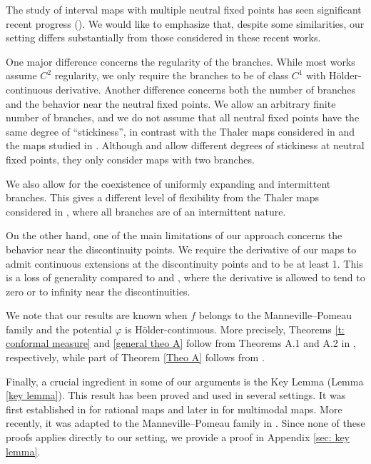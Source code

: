 \documentclass[10pt,a4paper]{amsart}
\numberwithin{equation}{section} %
\numberwithin{figure}{section} %
\renewcommand{\=}{\coloneqq}
\begin{document}
The study of interval maps with multiple neutral fixed points has seen significant recent progress (\cite{coatesGelfert,coatesMelbourne,CoatesMelbourneTalebi,coatesLuzzatto,coatesLuzzattoMubarak}). We would like to emphasize that, despite some similarities, our setting differs substantially from those considered in these recent works.

One major difference concerns the regularity of the branches. While most works assume $C^2$ regularity, we only require the branches to be of class $C^{1}$ with Hölder-continuous derivative. Another difference concerns both the number of branches and the behavior near the neutral fixed points. We allow an arbitrary finite number of branches, and we do not assume that all neutral fixed points have the same degree of ``stickiness'', in contrast with the Thaler maps considered in \cite{CoatesMelbourneTalebi} and the maps studied in \cite{coatesGelfert}. Although \cite{coatesLuzzatto} and \cite{coatesLuzzattoMubarak} allow different degrees of stickiness at neutral fixed points, they only consider maps with two branches.

We also allow for the coexistence of uniformly expanding and intermittent branches. This gives a different level of flexibility from the Thaler maps considered in \cite{CoatesMelbourneTalebi}, where all branches are of an intermittent nature.

On the other hand, one of the main limitations of our approach concerns the behavior near the discontinuity points. We require the derivative of our maps to admit continuous extensions at the discontinuity points and to be at least 1. This is a loss of generality compared to \cite{coatesLuzzatto} and \cite{coatesLuzzattoMubarak}, where the derivative is allowed to tend to zero or to infinity near the discontinuities.

We note that our results are known when $f$ belongs to the Manneville--Pomeau family and the potential $\varphi$ is Hölder-continuous. More precisely, Theorems \ref{t: conformal measure} and \ref{general theo A} follow from Theorems A.1 and A.2 in \cite{InoquioRivera2}, respectively, while part of Theorem \ref{Theo A} follows from \cite[Proposition 2.10]{coronelRivera1}.

Finally, a crucial ingredient in some of our arguments is the Key Lemma (Lemma \ref{key lemma}). This result has been proved and used in several settings. It was first established in \cite{InoquioRivera} for rational maps and later in \cite{LiHuaibin} for multimodal maps. More recently, it was adapted to the Manneville--Pomeau family in \cite{coronelRivera1}. Since none of these proofs applies directly to our setting, we provide a proof in Appendix \ref{sec: key lemma}.
\end{document}

